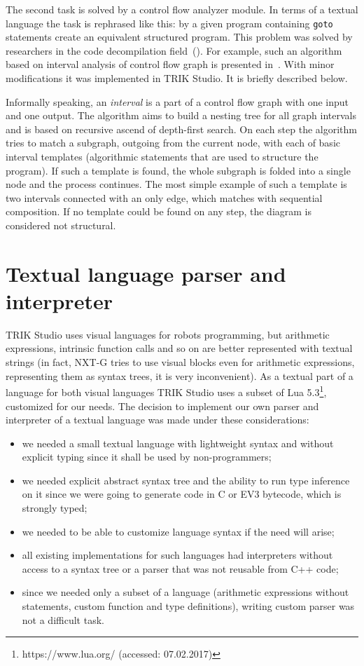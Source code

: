 \documentclass[conference]{IEEEtran}
\begin{document}
The second task is solved by a control flow analyzer module. In terms of a textual language the task is rephrased like this: by a given program containing \texttt{goto} statements create an equivalent structured program. This problem was solved by researchers in the code decompilation field~(\cite{steven1997advanced,деревенец2009структурный}). For example, such an algorithm based on interval analysis of control flow graph is presented in~\cite{steven1997advanced}. With minor modifications it was implemented in TRIK Studio. It is briefly described below.

Informally speaking, an \textit{interval} is a part of a control flow graph with one input and one output. The algorithm aims to build a nesting tree for all graph intervals and is based on recursive ascend of depth-first search. On each step the algorithm tries to match a subgraph, outgoing from the current node, with each of basic interval templates (algorithmic statements that are used to structure the program). If such a template is found, the whole subgraph is folded into a single node and the process continues. The most simple example of such a template is two intervals connected with an only edge, which matches with sequential composition. If no template could be found on any step, the diagram is considered not structural. 
 
\section{Textual language parser and interpreter}
\label{chapter:parser}
TRIK Studio uses visual languages for robots programming, but arithmetic expressions, intrinsic function calls and so on are better represented with textual strings (in fact, NXT-G tries to use visual blocks even for arithmetic expressions, representing them as syntax trees, it is very inconvenient). As a textual part of a language for both visual languages TRIK Studio uses a subset of Lua 5.3\footnote{https://www.lua.org/ (accessed: 07.02.2017)}, customized for our needs. The decision to implement our own parser and interpreter of a textual language was made under these considerations:

\begin{itemize}
	\item we needed a small textual language with lightweight syntax and without explicit typing since it shall be used by non-programmers;
	\item we needed explicit abstract syntax tree and the ability to run type inference on it since we were going to generate code in C or EV3 bytecode, which is strongly typed;
	\item we needed to be able to customize language syntax if the need will arise;
	\item all existing implementations for such languages had interpreters without access to a syntax tree or a parser that was not reusable from C++ code;
	\item since we needed only a subset of a language (arithmetic expressions without statements, custom function and type definitions), writing custom parser was not a difficult task.
\end{itemize}
\end{document}
